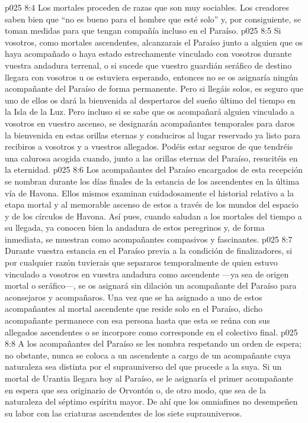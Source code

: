 \vs p025 8:4 Los mortales proceden de razas que son muy sociables. Los creadores saben bien que “no es bueno para el hombre que esté solo” y, por consiguiente, se toman medidas para que tengan compañía incluso en el Paraíso.
\vs p025 8:5 \pc Si vosotros, como mortales ascendentes, alcanzarais el Paraíso junto a alguien que os haya acompañado o haya estado estrechamente vinculado con vosotros durante vuestra andadura terrenal, o si sucede que vuestro guardián seráfico de destino llegara con vosotros u os estuviera esperando, entonces no se os asignaría ningún acompañante del Paraíso de forma permanente. Pero si llegáis solos, es seguro que uno de ellos os dará la bienvenida al despertaros del sueño último del tiempo en la Isla de la Luz. Pero incluso si se sabe que os acompañará alguien vinculado a vosotros en vuestro ascenso, se designarán acompañantes temporales para daros la bienvenida en estas orillas eternas y conduciros al lugar reservado ya listo para recibiros a vosotros y a vuestros allegados. Podéis estar seguros de que tendréis una calurosa acogida cuando, junto a las orillas eternas del Paraíso, resucitéis en la eternidad.
\vs p025 8:6 Los acompañantes del Paraíso encargados de esta recepción se nombran durante los días finales de la estancia de los ascendentes en la última vía de Havona. Ellos mismos examinan cuidadosamente el historial relativo a la etapa mortal y al memorable ascenso de estos a través de los mundos del espacio y de los círculos de Havona. Así pues, cuando saludan a los mortales del tiempo a su llegada, ya conocen bien la andadura de estos peregrinos y, de forma inmediata, se muestran como acompañantes compasivos y fascinantes.
\vs p025 8:7 Durante vuestra estancia en el Paraíso previa a la condición de finalizadores, si por cualquier razón tuvierais que separaros temporalmente de quien estuvo vinculado a vosotros en vuestra andadura como ascendente ---ya sea de origen mortal o seráfico---, se os asignará sin dilación un acompañante del Paraíso para aconsejaros y acompañaros. Una vez que se ha asignado a uno de estos acompañantes al mortal ascendente que reside solo en el Paraíso, dicho acompañante permanece con esa persona hasta que esta se reúna con sus allegados ascendentes o se incorpore como corresponde en el colectivo final.
\vs p025 8:8 \pc A los acompañantes del Paraíso se les nombra respetando un orden de espera; no obstante, nunca se coloca a un ascendente a cargo de un acompañante cuya naturaleza sea distinta por el suprauniverso del que procede a la suya. Si un mortal de Urantia llegara hoy al Paraíso, se le asignaría el primer acompañante en espera que sea originario de Orvontón o, de otro modo, que sea de la naturaleza del séptimo espíritu mayor. De ahí que los omniafines no desempeñen su labor con las criaturas ascendentes de los siete suprauniversos.
